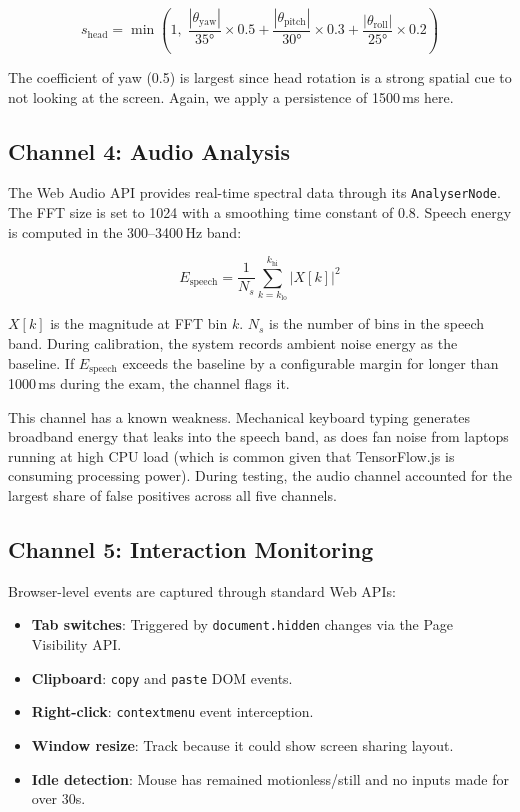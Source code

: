 \documentclass[runningheads]{llncs}
\begin{document}
\begin{equation}
    s_{\text{head}} = \min\left(1, \; \frac{|\theta_{\text{yaw}}|}{35°} \times 0.5 + \frac{|\theta_{\text{pitch}}|}{30°} \times 0.3 + \frac{|\theta_{\text{roll}}|}{25°} \times 0.2 \right)
\end{equation}

The coefficient of yaw (0.5) is largest since head rotation is a strong spatial cue to not looking at the screen. Again, we apply a persistence of 1500\,ms here.

\subsection{Channel 4: Audio Analysis}

The Web Audio API provides real-time spectral data through its \texttt{AnalyserNode}. The FFT size is set to 1024 with a smoothing time constant of 0.8. Speech energy is computed in the 300--3400\,Hz band:

\begin{equation}
    E_{\text{speech}} = \frac{1}{N_s}\sum_{k=k_{\text{lo}}}^{k_{\text{hi}}} |X[k]|^2
\end{equation}

$X[k]$ is the magnitude at FFT bin $k$. $N_s$ is the number of bins in the speech band. During calibration, the system records ambient noise energy as the baseline. If $E_{\text{speech}}$ exceeds the baseline by a configurable margin for longer than 1000\,ms during the exam, the channel flags it.

This channel has a known weakness. Mechanical keyboard typing generates broadband energy that leaks into the speech band, as does fan noise from laptops running at high CPU load (which is common given that TensorFlow.js is consuming processing power). During testing, the audio channel accounted for the largest share of false positives across all five channels.

\subsection{Channel 5: Interaction Monitoring}

Browser-level events are captured through standard Web APIs:

\begin{itemize}
    \item \textbf{Tab switches}: Triggered by \texttt{document.hidden} changes via the Page Visibility API.
    \item \textbf{Clipboard}: \texttt{copy} and \texttt{paste} DOM events.
    \item \textbf{Right-click}: \texttt{contextmenu} event interception.
    \item \textbf{Window resize}: Track because it could show screen sharing layout.
    \item \textbf{Idle detection}: Mouse has remained motionless/still and no inputs made for over 30s.
\end{itemize}
\end{document}
